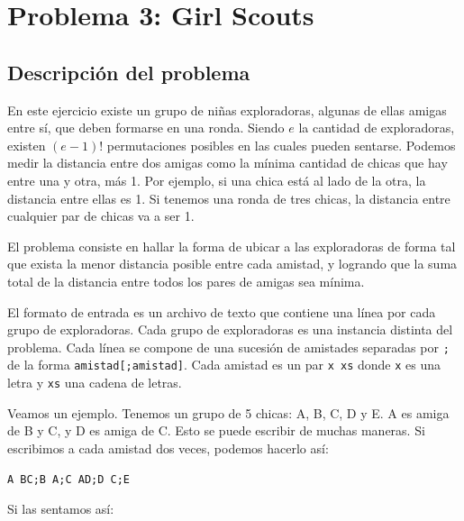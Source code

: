 \section{Problema 3: Girl Scouts}
\subsection{Descripción del problema}

En este ejercicio existe un grupo de niñas exploradoras, algunas de ellas amigas entre sí, que deben formarse en una ronda. Siendo $e$ la cantidad de exploradoras, existen $(e-1)!$ permutaciones posibles en las cuales pueden sentarse. Podemos medir la distancia entre dos amigas como la mínima cantidad de chicas que hay entre una y otra, más 1. Por ejemplo, si una chica está al lado de la otra, la distancia entre ellas es 1. Si tenemos una ronda de tres chicas, la distancia entre cualquier par de chicas va a ser 1.

El problema consiste en hallar la forma de ubicar a las exploradoras de forma tal que exista la menor distancia posible entre cada amistad, y logrando que la suma total de la distancia entre todos los pares de amigas sea mínima.

El formato de entrada es un archivo de texto que contiene una línea por cada grupo de exploradoras. Cada grupo de exploradoras es una instancia distinta del problema. Cada línea se compone de una sucesión de amistades separadas por \texttt{;} de la forma \texttt{amistad[;amistad]}. Cada amistad es un par \texttt{x xs} donde \texttt{x} es una letra y \texttt{xs} una cadena de letras.

Veamos un ejemplo. Tenemos un grupo de 5 chicas: A, B, C, D y E. A es amiga de B y C, y D es amiga de C. Esto se puede escribir de muchas maneras. Si escribimos a cada amistad dos veces, podemos hacerlo así:

\texttt{A BC;B A;C AD;D C;E}

Si las sentamos así:


